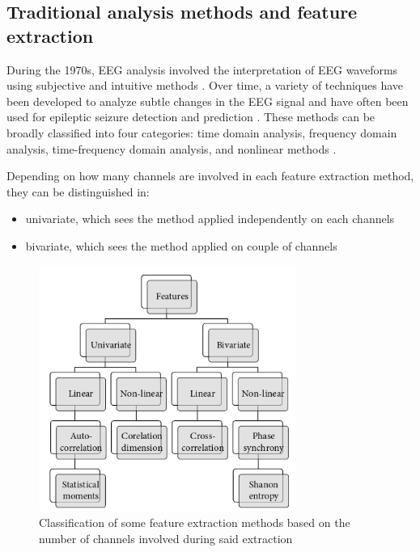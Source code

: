 \subsection{Traditional analysis methods and feature extraction}
During the 1970s, \gls{EEG} analysis involved the interpretation of \gls{EEG} waveforms using subjective and intuitive methods \cite{callaway_coupling_1974}. Over time, a variety of techniques have been developed to analyze subtle changes in the \gls{EEG} signal and have often been used for epileptic seizure detection and prediction \cite{natu_review_2022}. These methods can be broadly classified into four categories: time domain analysis, frequency domain analysis, time-frequency domain analysis, and nonlinear methods \cite{acharya_automated_2013}.

Depending on how many channels are involved in each feature extraction method, they can be distinguished in:
\begin{itemize}
    \item univariate, which sees the method applied independently on each channels
    \item bivariate, which sees the method applied on couple of channels
\end{itemize}

\begin{figure}[ht]
    \centering
    \includegraphics[width=0.75\textwidth]{images/State-of-art/univariate-bivariate-feature-extraction.png}
    \caption{Classification of some feature extraction methods based on the number of channels involved during said extraction \cite{natu_review_2022}}
    \label{fig:univariate-bivariate-feature-extraction}
\end{figure}

